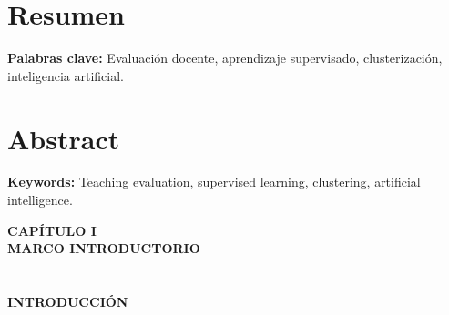 \documentclass[12pt,oneside,letterpaper]{book}
\begin{document}
\newpage
\thispagestyle{empty}
\renewcommand{\cftchapdotsep}{\cftdotsep}
\renewcommand{\contentsname}{ÍNDICE}
\renewcommand{\cfttoctitlefont}{\large\bfseries}
\tableofcontents

\newpage
\thispagestyle{empty}
\renewcommand{\listtablename}{ÍNDICE DE TABLAS}
\renewcommand{\cftlottitlefont}{\large\bfseries}
\renewcommand{\cfttabdotsep}{\cftdotsep}
\listoftables

\newpage
\thispagestyle{empty}
\renewcommand{\listfigurename}{ÍNDICE DE IMÁGENES}
\renewcommand{\cftloftitlefont}{\large\bfseries}
\renewcommand{\cftfigdotsep}{\cftdotsep}
\listoffigures

\newpage
{} %
\section*{Resumen}
\lipsum[1]

\bigskip
\noindent \textbf{Palabras clave:} Evaluación docente, aprendizaje supervisado, clusterización, inteligencia artificial.

\newpage
\section*{Abstract}
\lipsum[1]

\bigskip
\noindent \textbf{Keywords:} Teaching evaluation, supervised learning, clustering, artificial intelligence.

\newpage
{}
\thispagestyle{empty}
\vspace*{0.35\textheight}
\begin{center}
	{\Huge\textbf{CAPÍTULO I}} \\[0.5cm]
	{\Huge\textbf{MARCO INTRODUCTORIO}}
\end{center}
\newpage
\thispagestyle{fancy}

\section*{}
\begin{center}
	\large \textbf{INTRODUCCIÓN}
\end{center}
\end{document}
